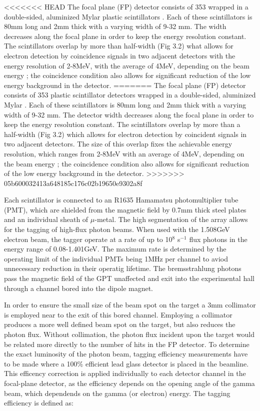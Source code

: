 <<<<<<< HEAD
\indent The focal plane (FP) detector consists of 353 wrapped in a double-sided, aluminized Mylar plastic scintillators \cite{sjhall}. Each of these scintillators is 80mm long and 2mm thick with a varying width of 9-32 mm. The width decreases along the focal plane in order to keep the energy resolution constant. The scintillators overlap by more than half-width (Fig 3.2) what allows for electron detection by coincidence signals in two adjacent detectors with the energy resolution of 2-8MeV, with the average of 4MeV, depending on the beam energy \cite{mcgeorge}; the coincidence condition also allows for significant reduction of the low energy background in the detector.
=======
\indent The focal plane (FP) detector consists of 353 plastic scintillator detectors wrapped in a double-sided, aluminized Mylar \cite{shall}. Each of these scintillators is 80mm long and 2mm thick with a varying width of 9-32 mm. The detector width decreases along the focal plane in order to keep the energy resolution constant. The scintillators overlap by more than a half-width (Fig 3.2) which allows for electron detection by coincident signals in two adjacent detectors. The size of this overlap fixes the achievable energy resolution, which ranges from 2-8MeV with an average of 4MeV, depending on the beam energy \cite{mcgeorge}; the coincidence condition also allows for significant reduction of the low energy background in the detector.
>>>>>>> 05b600032413a648185c176c02b19650e9302a8f

\indent Each scintillator is connected to an R1635 Hamamatsu photomultiplier tube (PMT), which are shielded from the magnetic field by 0.7mm thick steel plates and an individual sheath of $\mu$-metal. The high segmentation of the array allows for the tagging of high-flux photon beams. When used with the 1.508GeV electron beam, the tagger operate at a rate of up to 10$^{8}$ s$^{-1}$ flux photons in the energy range of 0.08-1.401GeV. The maximum rate is determined by the operating limit of the individual PMTs being 1MHz per channel to aviod unnecessary reduction in their operatig lifetime. The bremsstrahlung photons pass the magnetic field of the GPT unaffected and exit into the experimental hall through a channel bored into the dipole magnet.

\indent In order to ensure the small size of the beam spot on the target a 3mm collimator is employed near to the exit of this bored channel. Employing a collimator produces a more well defined beam spot on the target, but also reduces the photon flux.  Without collimation, the photon flux incident upon the target would be related more directly to the number of hits in the FP detector. To determine the exact luminosity of the photon beam, tagging efficiency measurements have to be made where a 100\% efficient lead glass detector is placed in the beamline.  This efficency correction is applied individually to each detector channel in the focal-plane detector, as the efficiency depends on the opening angle of the gamma beam, which dependends on the gamma (or electron) energy. The tagging efficiency is defined as:

